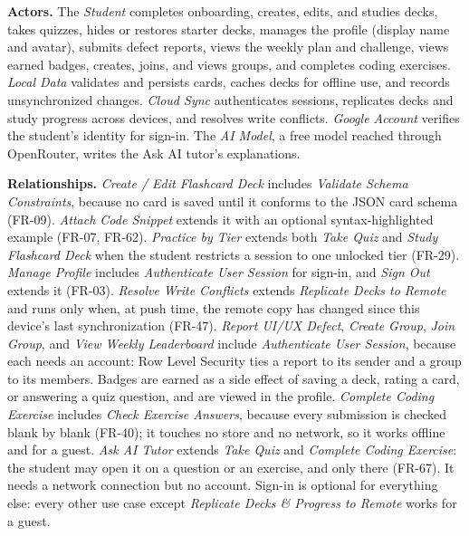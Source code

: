 \documentclass[12pt,letterpaper]{article}
\begin{document}
\textbf{Actors.} The \emph{Student} completes onboarding, creates, edits, and studies
decks, takes quizzes, hides or restores starter decks, manages the profile (display
name and avatar), submits defect reports, views the weekly plan and challenge, views
earned badges, creates, joins, and views groups, and completes coding exercises.
\emph{Local Data} validates and persists cards,
caches decks for offline use, and records unsynchronized changes. \emph{Cloud Sync}
authenticates sessions, replicates decks and study progress across devices, and
resolves write conflicts.
\emph{Google Account} verifies the student's identity for sign-in. The \emph{AI Model},
a free model reached through OpenRouter, writes the Ask AI tutor's explanations.

\textbf{Relationships.} \emph{Create / Edit Flashcard Deck} includes \emph{Validate
Schema Constraints}, because no card is saved until it conforms to the JSON card schema
(FR-09). \emph{Attach Code Snippet} extends it with an optional syntax-highlighted
example (FR-07, FR-62). \emph{Practice by Tier} extends both \emph{Take Quiz} and
\emph{Study Flashcard Deck} when the student restricts a session to one unlocked tier
(FR-29). \emph{Manage Profile} includes \emph{Authenticate User Session} for sign-in,
and \emph{Sign Out} extends it (FR-03). \emph{Resolve Write Conflicts} extends
\emph{Replicate Decks to Remote} and runs only when, at push time, the remote copy has
changed since this device's last synchronization (FR-47). \emph{Report UI/UX Defect},
\emph{Create Group}, \emph{Join Group}, and \emph{View Weekly Leaderboard} include
\emph{Authenticate User Session}, because each needs an account: Row Level Security
ties a report to its sender and a group to its members. Badges are earned as a side
effect of saving a deck, rating a card, or answering a quiz question, and are viewed
in the profile. \emph{Complete Coding Exercise} includes \emph{Check Exercise
Answers}, because every submission is checked blank by blank (FR-40); it touches no
store and no network, so it works offline and for a guest. \emph{Ask AI Tutor}
extends \emph{Take Quiz} and \emph{Complete Coding Exercise}: the student may open it
on a question or an exercise, and only there (FR-67). It needs a network connection
but no account. Sign-in is optional for
everything else: every other use case except \emph{Replicate Decks \& Progress to
Remote} works for a guest.
\end{document}
